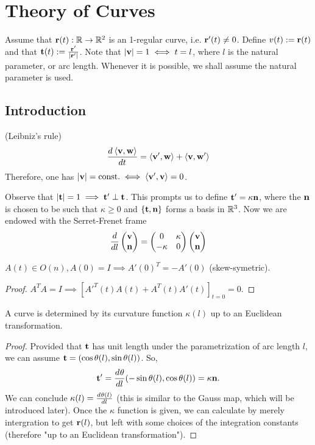 \section{Theory of Curves}
Assume that $\mathbf{r}(t): \mathbb{R} \rightarrow \mathbb{R}^2$ is an 1-regular curve, i.e. $\mathbf{r}'(t) \neq 0$. Define $v(t) := \mathbf{r}(t)$ and that $\mathbf{t}(t) := \frac{\mathbf{r}'}{|\mathbf{r}'|}$. Note that $|\mathbf{v}| = 1 \iff t = l$, where $l$ is the natural parameter, or arc length. Whenever it is possible, we shall assume the natural parameter is used.

\subsection{Introduction}
\begin{fact}
	(Leibniz's rule) \[ \frac{d^{}  \left< \mathbf{v}, \mathbf{w} \right>}{d t^{}} = \left< \mathbf{v'}, \mathbf{w} \right> + \left< \mathbf{v}, \mathbf{w'} \right>\] Therefore, one has $|\mathbf{v}| = \text{const.} \iff \left< \mathbf{\mathbf{v}'}, \mathbf{v} \right> = 0$.
\end{fact}

Observe that $|\mathbf{t}| = 1 \implies \mathbf{t}' \perp \mathbf{t}$. This prompts us to define $\mathbf{t}' = \kappa \mathbf{n}$, where the $\mathbf{n}$ is chosen to be such that $\kappa \geq 0$ and $\{\mathbf{t}, \mathbf{n}\}$ forms a basis in $\mathbb{R}^3$. Now we are endowed with the Serret-Frenet frame \[ \frac{d}{dl}
\begin{pmatrix}
 \mathbf{v} \\
 \mathbf{n}
\end{pmatrix}
=
\begin{pmatrix}{}
0 & \kappa \\
-\kappa & 0
\end{pmatrix}
\begin{pmatrix}
\mathbf{v} \\
\mathbf{n}
\end{pmatrix}
\]

\begin{fact}
	$A(t) \in O(n), A(0) = I \implies A'(0)^{T} = -A'(0)$ (skew-symetric).
\end{fact}
\begin{proof}
	$A^{T}A = I \implies [A'^{T}(t)A(t) + A^T(t) A'(t)]_{t = 0} = 0$.
\end{proof}

\begin{theorem}
	A curve is determined by its curvature function $\kappa(l)$ up to an Euclidean transformation.
\end{theorem}
\begin{proof}
	Provided that $\mathbf{t}$ has unit length under the parametrization of arc length $l$, we can assume $\mathbf{t} = (\cos\theta(l), \sin\theta(l))$. So, \[\mathbf{t}' = \frac{d^{} \theta}{d l^{}}(-\sin\theta(l), \cos\theta(l)) = \kappa \mathbf{n}.\] We can conclude $\kappa(l) = \frac{d^{} \theta(l)}{d l^{}}$ (this is similar to the Gauss map, which will be introduced later). Once the $\kappa$ function is given, we can calculate by merely intergration to get $\mathbf{r}(l)$, but left with some choices of the integration constants (therefore "up to an Euclidean transformation").
\end{proof}


